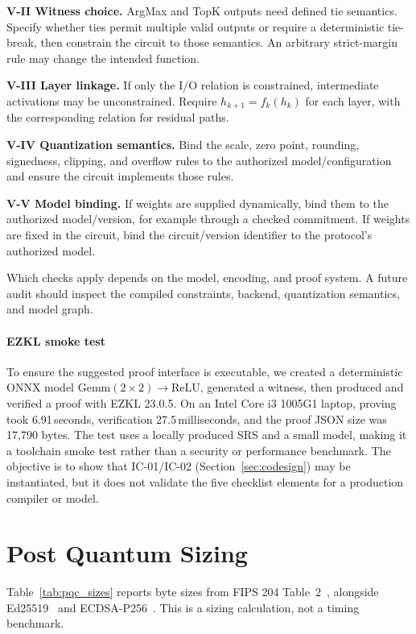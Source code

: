\documentclass[conference]{IEEEtran}
\begin{document}
\textbf{V-II Witness choice.} ArgMax and TopK outputs need defined tie semantics. Specify whether ties permit multiple valid outputs or require a deterministic tie-break, then constrain the circuit to those semantics. An arbitrary strict-margin rule may change the intended function.

\textbf{V-III Layer linkage.} If only the I/O relation is constrained, intermediate activations may be unconstrained. Require $h_{k+1}=f_k(h_k)$ for each layer, with the corresponding relation for residual paths.

\textbf{V-IV Quantization semantics.} Bind the scale, zero point, rounding, signedness, clipping, and overflow rules to the authorized model/configuration and ensure the circuit implements those rules.

\textbf{V-V Model binding.} If weights are supplied dynamically, bind them to the authorized model/version, for example through a checked commitment. If weights are fixed in the circuit, bind the circuit/version identifier to the protocol's authorized model.

Which checks apply depends on the model, encoding, and proof system. A future audit should inspect the compiled constraints, backend, quantization semantics, and model graph.

\paragraph{EZKL smoke test}
To ensure the suggested proof interface is executable, we created a deterministic ONNX model $\mathrm{Gemm}(2\times2)\to\mathrm{ReLU}$, generated a witness, then produced and verified a proof with EZKL 23.0.5. On an Intel Core i3 1005G1 laptop, proving took 6.91\,seconds, verification 27.5\,milliseconds, and the proof JSON size was 17{,}790 bytes. The test uses a locally produced SRS and a small model, making it a toolchain smoke test rather than a security or performance benchmark. The objective is to show that IC-01/IC-02 (Section~\ref{sec:codesign}) may be instantiated, but it does not validate the five checklist elements for a production compiler or model.

\section{Post Quantum Sizing}
\label{sec:pqc}

Table~\ref{tab:pqc_sizes} reports byte sizes from FIPS 204 Table~2~\cite{nistfips204}, alongside Ed25519~\cite{rfc8032} and ECDSA-P256~\cite{nistfips1865}. This is a sizing calculation, not a timing benchmark.
\end{document}
